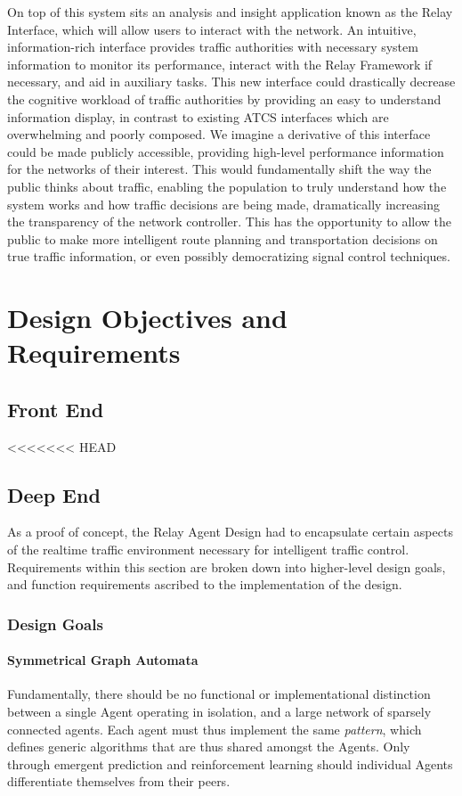 \documentclass{report}
\begin{document}
On top of this system sits an analysis and insight application known as the Relay Interface, which will allow users to interact with the network.
An intuitive, information-rich interface provides traffic authorities with necessary system information to monitor its performance, interact with the Relay Framework if necessary, and aid in auxiliary tasks.
This new interface could drastically decrease the cognitive workload of traffic authorities by providing an easy to understand information display, in contrast to existing ATCS interfaces which are overwhelming and poorly composed.
We imagine a derivative of this interface could be made publicly accessible, providing high-level performance information for the networks of their interest.
This would fundamentally shift the way the public thinks about traffic, enabling the population to truly understand how the system works and how traffic decisions are being made, dramatically increasing the transparency of the network controller.
This has the opportunity to allow the public to make more intelligent route planning and transportation decisions on true traffic information, or even possibly democratizing signal control techniques.

\newpage
\chapter{Design Objectives and Requirements}
\section{Front End}

<<<<<<< HEAD

\section{Deep End}
\label{sec:deep:design_requirements}

As a proof of concept, the Relay Agent Design had to encapsulate certain aspects of the realtime traffic environment necessary for intelligent traffic control.
Requirements within this section are broken down into higher-level design goals, and function requirements ascribed to the implementation of the design.

\subsection{Design Goals}
\subsubsection{Symmetrical Graph Automata}
Fundamentally, there should be no functional or implementational distinction between a single Agent operating in isolation, and a large network of sparsely connected agents.
Each agent must thus implement the same \emph{pattern}, which defines generic algorithms that are thus shared amongst the Agents.
Only through emergent prediction and reinforcement learning should individual Agents differentiate themselves from their peers.
\end{document}
